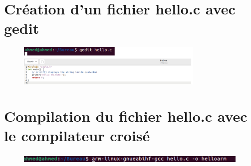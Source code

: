 \section{Création d’un fichier hello.c  avec gedit}

\begin{figure}[h]

    \includegraphics[width=0.8\textwidth]{images/1.png}

\end{figure}



\section{Compilation du fichier hello.c avec le compilateur croisé}

\begin{figure}[h]

    \includegraphics[width=1\textwidth]{images/2.png}

\end{figure}

